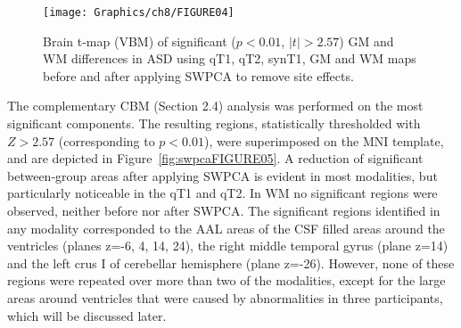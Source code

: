 \begin{figure}
	\centering
	\texttt{[image: Graphics/ch8/FIGURE04]}
	\caption[Brain t-map (\acs{VBM}) of significant ($p<0.01$, $|t|>2.57$) \acs{GM} and \acs{WM} differences in \acs{ASD} using \acs{qT1}, \acs{qT2}, \acs{synT1}, \acs{GM} and \acs{WM} maps before and after applying \acs{SWPCA} to remove site effects.]{Brain t-map (\ac{VBM}) of significant ($p<0.01$, $|t|>2.57$) \ac{GM} and \ac{WM} differences in \ac{ASD} using \ac{qT1}, \ac{qT2}, \ac{synT1}, \ac{GM} and \ac{WM} maps before and after applying \ac{SWPCA} to remove site effects.}
	\label{fig:swpcaFIGURE04}
\end{figure}

The complementary CBM (Section 2.4) analysis was performed on the most
significant components. The resulting regions, statistically
thresholded with $Z>2.57$ (corresponding to $p<0.01$), were superimposed on the
\ac{MNI} template, and are depicted in Figure~\ref{fig:swpcaFIGURE05}. A reduction of significant
between-group areas after applying SWPCA is evident in most modalities,
but particularly noticeable in the \ac{qT1} and \ac{qT2}. In \ac{WM} no significant
regions were observed, neither before nor after SWPCA. The significant
regions identified in any modality corresponded to the AAL areas of the
CSF filled areas around the ventricles (planes z=-6, 4, 14, 24), the
right middle temporal gyrus (plane z=14) and the left crus I of
cerebellar hemisphere (plane z=-26). However, none of these regions
were repeated over more than two of the modalities, except for the
large areas around ventricles that were caused by abnormalities in
three participants, which will be discussed later.

